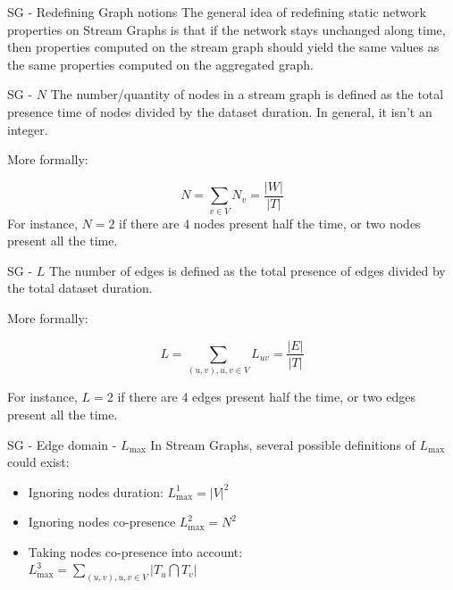 \documentclass[a4paper,11pt]{book}
\begin{document}
\begin{textbox}{SG - Redefining Graph notions}
The general idea of redefining static network properties on Stream Graphs is that if the network stays unchanged along time, then properties computed on the stream graph should yield the same values as the same properties computed on the aggregated graph.
\end{textbox}


\begin{textbox}{SG - $N$}
The number/quantity of nodes in a stream graph is defined as the total presence time of nodes divided by the dataset duration. In general, it isn't an integer.

More formally:

\[
N=\sum_{v\in V} N_v = \frac{|W|}{|T|}
\]
For instance, $N=2$ if there are 4 nodes present half the time, or two nodes present all the time.
\end{textbox}



\begin{textbox}{SG - $L$}
The number of edges is defined as the total presence of edges divided by the total dataset duration.

More formally:

\[
L=\sum_{(u,v),u,v \in V} L_{uv}=\frac{|E|}{|T|}
\]

For instance, $L=2$ if there are 4 edges present half the time, or two edges present all the time.
\end{textbox}




\begin{textbox}{SG - Edge domain - $L_{\max}$}
In Stream Graphs, several possible definitions of ${L_{\max}}$ could exist:
\begin{itemize}
    \item Ignoring nodes duration: ${L_{\max}^1}=|V|^2$
    \item Ignoring nodes co-presence ${L_{\max}^2}=N^2$
    \item Taking nodes co-presence into account:  \\ ${L_{\max}^3}=\sum_{(u,v),u,v \in V}|T_u \bigcap T_v|$
\end{itemize}

\end{textbox}
\end{document}
